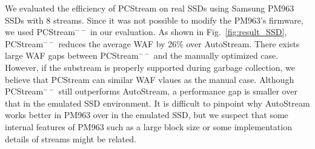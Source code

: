 We evaluated the efficiency of {\sf PCStream} on real SSDs using Samsung PM963 SSDs with 8 streams.  
Since it was not possible to modify the PM963's firmware, 
we used {\sf PCStream}$^{--}$ in our evaluation.
As shown in Fig.~\ref{fig:result_SSD}, 
{\sf PCStream}$^{--}$ reduces the average WAF by 26\% over AutoStream. 
There exists large WAF gaps between {\sf PCStream}$^{--}$ and the manually optimized case. 
However, if the substream is properly supported during garbage collection, 
we believe that {\sf PCStream} can similar WAF vlaues as the manual case. 
Although {\sf PCStream}$^{--}$ still outperforms AutoStream, 
a performance gap is smaller over that in the emulated SSD environment. 
It is difficult to pinpoint why AutoStream works better in PM963 over in the emulated SSD, 
but we suspect that some internal features of PM963 such as a large block size or some implementation details of streams might be related. 

